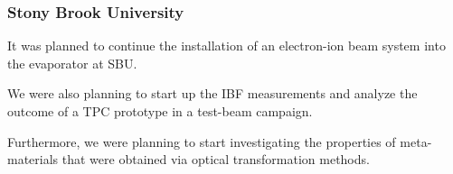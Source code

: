 \subsubsection{Stony Brook University} 
It was planned to continue the installation of an electron-ion beam system into the evaporator at SBU.

We were also planning to start up the IBF measurements and analyze the outcome of a TPC prototype in a test-beam campaign.

Furthermore, we were planning to start investigating the properties of meta-materials that were obtained via optical transformation methods.